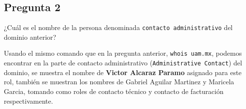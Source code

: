 \subsection{Pregunta 2}

¿Cuál es el nombre de la persona denominada \texttt{contacto administrativo} del dominio anterior? 

\begin{respuesta}

Usando el mismo comando que en la pregunta anterior, \texttt{whois uam.mx}, podemos encontrar en la parte de contacto administrativo (\texttt{Administrative Contact}) del dominio, se muestra el nombre de \textbf{Victor Alcaraz Paramo} asignado para este rol, también se muestran los nombres de Gabriel Aguilar Martinez y Maricela Garcia, tomando como roles de contacto técnico y contacto de facturación respectivamente.

\end{respuesta}
